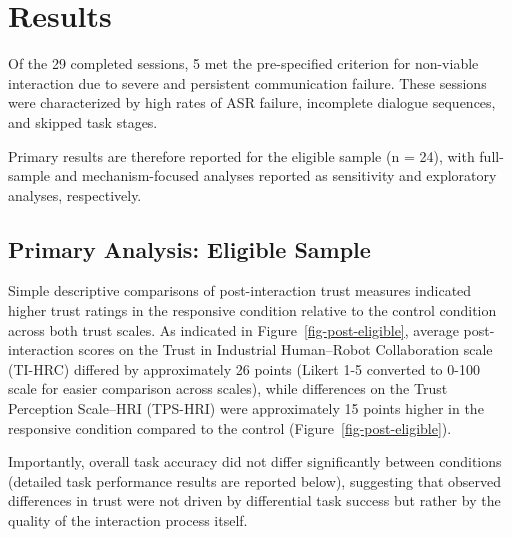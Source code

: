 \documentclass[
  letterpaper,
  DIV=11,
  numbers=noendperiod]{scrartcl}
\begin{document}
\section{Results}\label{results}

Of the 29 completed sessions, 5 met the pre-specified criterion for
non-viable interaction due to severe and persistent communication
failure. These sessions were characterized by high rates of ASR failure,
incomplete dialogue sequences, and skipped task stages.

Primary results are therefore reported for the eligible sample (n = 24),
with full-sample and mechanism-focused analyses reported as sensitivity
and exploratory analyses, respectively.

\subsection{Primary Analysis: Eligible
Sample}\label{primary-analysis-eligible-sample}

Simple descriptive comparisons of post-interaction trust measures
indicated higher trust ratings in the responsive condition relative to
the control condition across both trust scales. As indicated in
Figure~\ref{fig-post-eligible}, average post-interaction scores on the
Trust in Industrial Human--Robot Collaboration scale (TI-HRC) differed
by approximately 26 points (Likert 1-5 converted to 0-100 scale for
easier comparison across scales), while differences on the Trust
Perception Scale--HRI (TPS-HRI) were approximately 15 points higher in
the responsive condition compared to the control
(Figure~\ref{fig-post-eligible}).

Importantly, overall task accuracy did not differ significantly between
conditions (detailed task performance results are reported below),
suggesting that observed differences in trust were not driven by
differential task success but rather by the quality of the interaction
process itself.
\end{document}
